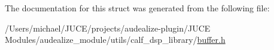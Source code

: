 The documentation for this struct was generated from the following file\+:\begin{DoxyCompactItemize}
\item 
/\+Users/michael/\+J\+U\+C\+E/projects/audealize-\/plugin/\+J\+U\+C\+E Modules/audealize\+\_\+module/utils/calf\+\_\+dsp\+\_\+library/\hyperlink{buffer_8h}{buffer.\+h}\end{DoxyCompactItemize}
